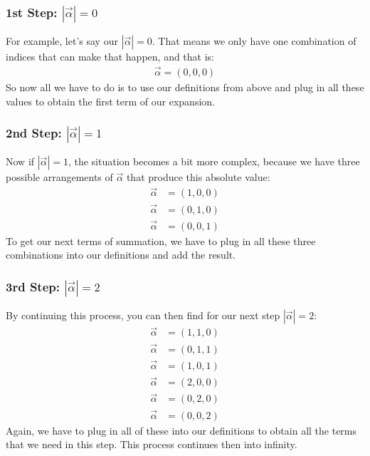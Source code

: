 \documentclass{article}
\begin{document}
	\subsubsection*{1st Step: $|\vec{\alpha}|=0$}
	For example, let's say our $|\vec{\alpha}|=0$. That means we only have one combination of indices that can make that happen, and that is:
	\begin{align}
		\vec{\alpha}=(0,0,0)
	\end{align}
	So now all we have to do is to use our definitions from above and plug in all these values to obtain the first term of our expansion. 
	
	\subsubsection*{2nd Step: $|\vec{\alpha}|=1$}
	Now if $|\vec{\alpha}|=1$, the situation becomes a bit more complex, because we have three possible arrangements of $\vec{\alpha}$ that produce this absolute value:
	\begin{align}
		\vec{\alpha} &= (1,0,0) \\
		\vec{\alpha} &= (0,1,0) \\
		\vec{\alpha} &= (0,0,1)
	\end{align}
	To get our next terms of summation, we have to plug in all these three combinations into our definitions and add the result.
	
	\subsubsection*{3rd Step: $|\vec{\alpha}|=2$}
	By continuing this process, you can then find for our next step $|\vec{\alpha}|=2$: 
	\begin{align}
		\vec{\alpha} &= (1,1,0) \\
		\vec{\alpha} &= (0,1,1) \\
		\vec{\alpha} &= (1,0,1) \\
		\vec{\alpha} &= (2,0,0) \\
		\vec{\alpha} &= (0,2,0) \\
		\vec{\alpha} &= (0,0,2)
	\end{align}
	Again, we have to plug in all of these into our definitions to obtain all the terms that we need in this step. 
	This process continues then into infinity.
	
\end{document}
